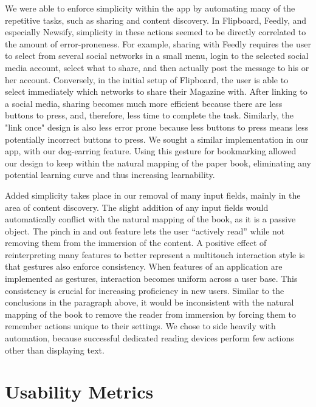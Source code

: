 \documentclass[11pt, oneside]{article}   	%
\begin{document}
We were able to enforce simplicity within the app by automating many of the repetitive tasks, such as sharing and content discovery. In Flipboard, Feedly, and especially Newsify, simplicity in these actions seemed to be directly correlated to the amount of error-proneness. For example, sharing with Feedly requires the user to select from several social networks in a small menu, login to the selected social media account, select what to share, and then actually post the message to his or her account. Conversely, in the initial setup of Flipboard, the user is able to select immediately which networks to share their Magazine with. After linking to a social media, sharing becomes much more efficient because there are less buttons to press, and, therefore, less time to complete the task. Similarly, the "link once" design is also less error prone because less buttons to press means less potentially incorrect buttons to press. We sought a similar implementation in our app, with our dog-earring feature. Using this gesture for bookmarking allowed our design to keep within the natural mapping of the paper book, eliminating any potential learning curve and thus increasing learnability.

Added simplicity takes place in our removal of many input fields, mainly in the area of content discovery. The slight addition of any input fields would automatically conflict with the natural mapping of the book, as it is a passive object. The pinch in and out feature lets the user ``actively read'' while not removing them from the immersion of the content. A positive effect of reinterpreting many features to better represent a multitouch interaction style is that gestures also enforce consistency. When features of an application are implemented as gestures, interaction becomes uniform across a user base. This consistency is crucial for increasing proficiency in new users. Similar to the conclusions in the paragraph above, it would be inconsistent with the natural mapping of the book to remove the reader from immersion by forcing them to remember actions unique to their settings. We chose to side heavily with automation, because successful dedicated reading devices perform few actions other than displaying text.

\section{Usability Metrics}
\end{document}
